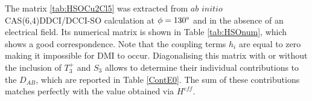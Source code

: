 \documentclass[10pt]{report}
\numberwithin{equation}{section}
\begin{document}
\begin{table}[!ht]
    \centering
\caption{Numerical matrix of $\hat{H}^{SO}$ and electronic couplings in the uncoupled basis from a CAS(6,4)DDCI/DDCI-SO calculation with no electric field and $\phi=130\degree$.}
\label{tab:HSOnum}
\end{table}
The matrix \ref{tab:HSOCu2Cl5} was extracted from $ab$ $initio$ CAS(6,4)DDCI/DCCI-SO calculation at $\phi=130\degree$ and in the absence of an electrical field. Its numerical matrix is shown in Table \ref{tab:HSOnum}, which shows a good correspondence. 
Note that the coupling terms $h_i$ are equal to zero making it impossible for DMI to occur.
Diagonalising this matrix with or without the inclusion of $T_3^+$ and $S_3$ allows to determine their individual contributions to the $D_{AB}$, which are reported in Table \ref{ContE0}.
The sum of these contributions matches perfectly with the value obtained via $H^{eff}$.
\end{document}
